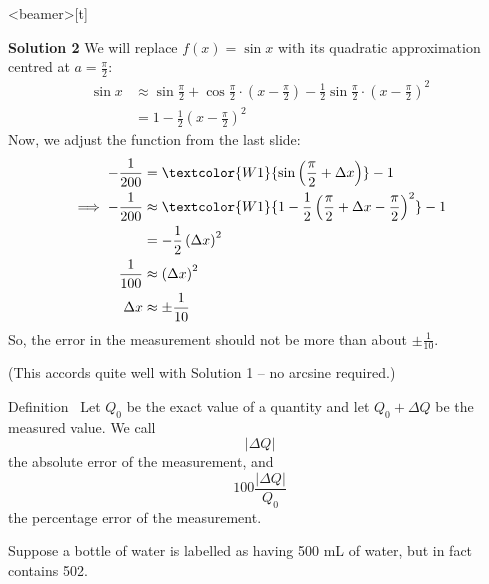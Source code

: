 \begin{frame}<beamer>[t]
\small
{}
\color{answercolor}

\textbf{Solution 2}
We will replace $f(x)=\sin x$ with its quadratic approximation centred at $a=\frac{\pi}{2}$:
\begin{align*}
 \sin x &\approx \sin\frac\pi2 + \cos\frac\pi2\cdot\left(x-\frac{\pi}{2}\right)-\frac12\sin\frac\pi2\cdot\left(x-\frac{\pi}{2}\right)^2\\
 &=1-\frac12\left(x-\frac{\pi}{2}\right)^2
\end{align*}
Now, we adjust the function from the last slide:
\begin{align*}
-\frac{1}{200}&=\textcolor{W1}{\sin \left(\frac{\pi}{2}+\Delta x\right)} - 1\\
\implies -\frac1{200}& \approx \textcolor{W1}{1-\frac12\left(\frac{\pi}{2}+\Delta x-\frac{\pi}{2}\right)^2}-1\\
&=-\frac12\left(\Delta x\right)^2\\
\frac{1}{100}&\approx\left(\Delta x\right)^2\\
\Delta x & \approx \pm\frac1{10}
\end{align*}
So, the error in the measurement should not be more than about $\pm \frac1{10}$.

(This accords quite well with Solution 1 -- no arcsine required.)

\end{frame}
\begin{frame}[t]
\begin{block}{Definition~}
Let $Q_0$ be the exact value of a quantity and let $Q_0+\Delta Q$ be the measured value. We call \[|\Delta Q|\]
the \alert{absolute error} of the measurement, and 
\[100\frac{|\Delta Q|}{Q_0}\]
the \alert{percentage error} of the measurement.
\end{block}\pause\vfill
\color{C1}
Suppose a bottle of water is labelled as having 500 mL of water, but in fact contains 502. \vfill

\pause\color{answercolor}
\end{frame}
